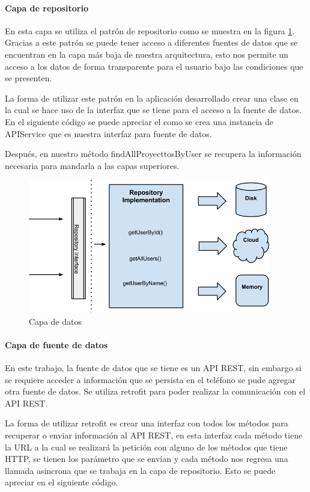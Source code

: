 \paragraph{Capa de repositorio} En esta capa se utiliza el patrón de repositorio como se muestra en la figura \ref{fig:capa-datos}. Gracias a este patrón se puede tener acceso a diferentes fuentes de datos que se encuentran en la capa más baja de nuestra arquitectura, esto nos permite un acceso a los datos de forma transparente para el usuario bajo las condiciones que se presenten.

La forma de utilizar este patrón en la aplicación desarrollado crear una clase en la cual se hace uso de la interfaz que se tiene para el acceso a la fuente de datos. En el siguiente código se puede apreciar el como se crea una instancia de APIService que es nuestra interfaz para fuente de datos.

Después, en nuestro método findAllProyecttosByUser se recupera la información necesaria para mandarla a las capas superiores.



\begin{figure}[h]
    \centering
    \includegraphics[width=400px]{capitulo5/android/img/capa-datos.png}
    \caption{Capa de datos \cite{cleanWay}}
    \label{fig:capa-datos}
\end{figure}

\paragraph{Capa de fuente de datos} En este trabajo, la fuente de datos que se tiene es un API REST, sin embargo si se requiere acceder a información que se persista en el teléfono se pude agregar otra fuente de datos. Se utiliza retrofit para poder realizar la comunicación con el API REST. 

La forma de utilizar retrofit es crear una interfaz con todos los métodos para recuperar o enviar información al API REST, en esta interfaz cada método tiene la URL a la cual se realizará la petición con alguno de los métodos que tiene HTTP, se tienen los parámetro que se envían y cada método nos regresa una llamada asincrona que se trabaja en la capa de repositorio. Esto se puede apreciar en el siguiente código.

